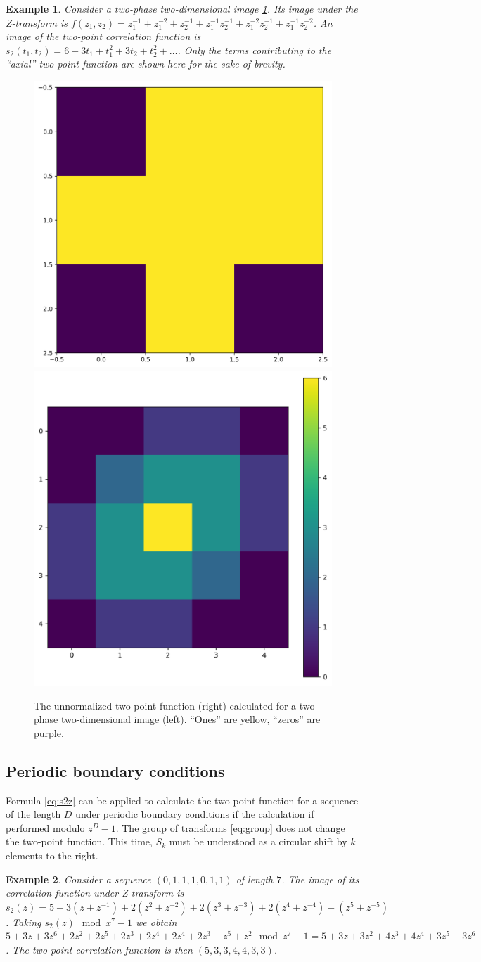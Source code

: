 \documentclass[12pt, a4paper]{article}
\newtheorem{example}{Example}
\begin{document}
\begin{example}
  Consider a two-phase two-dimensional image \cref{fig:2d-example}. Its image
  under the Z-transform is
  $f(z_1, z_2) = z_1^{-1} + z_1^{-2} + z_2^{-1} + z_1^{-1}z_2^{-1} + z_1^{-2}z_2^{-1} + z_1^{-1}z_2^{-2}$.
  An image of the two-point correlation function is
  $s_2(t_1, t_2) = 6 + 3t_1 + t_1^2 + 3t_2 + t_2^2 + \dots$.
  Only the terms contributing to the ``axial'' two-point function are shown here
  for the sake of brevity.
\end{example}
\begin{figure}[tp]
  \centering
  \includegraphics[width=0.4\linewidth]{images/example-s2-image.png}
  \hfill
  \includegraphics[width=0.4\linewidth]{images/example-s2.png}
  \caption[]{The unnormalized two-point function (right) calculated for a
    two-phase two-dimensional image (left). ``Ones'' are yellow, ``zeros'' are
    purple.}
  \label{fig:2d-example}
\end{figure}

\subsection{Periodic boundary conditions}
Formula \ref{eq:s2z} can be applied to calculate the two-point function for a
sequence of the length $D$ under periodic boundary conditions if the calculation
if performed modulo $z^D - 1$. The group of transforms \cref{eq:group} does not
change the two-point function. This time, $S_k$ must be understood as a circular
shift by $k$ elements to the right.
\begin{example}
  Consider a sequence $(0, 1, 1, 1, 0, 1, 1)$ of length $7$. The image of its
  correlation function under Z-transform is
  $s_2(z) = 5 + 3(z+z^{-1}) + 2(z^2 + z^{-2}) + 2(z^3 + z^{-3}) + 2(z^4 +
  z^{-4}) + (z^5 + z^{-5})$.
  Taking $s_2(z) \mod x^7-1$ we obtain
  $5 + 3z + 3z^6 + 2z^2 + 2z^5 + 2z^3 + 2z^4 + 2z^4 + 2z^3 + z^5 + z^2 \mod z^7 - 1 = 5 + 3z + 3z^2 + 4z^3 + 4z^4 + 3z^5 + 3z^6$.
  The two-point correlation function is then $(5, 3, 3, 4, 4, 3, 3)$.
\end{example}
\end{document}
